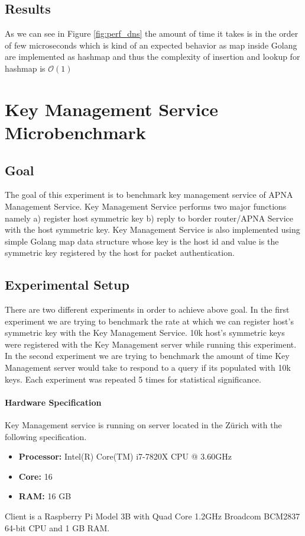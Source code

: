 \subsection{Results}
As we can see in Figure \ref{fig:perf_dns} the amount of time it takes is in the order of few microseconds which is kind of an expected behavior as map inside Golang are implemented as hashmap and thus the complexity of insertion and lookup for hashmap is $\mathcal{O}(1)$ 

\section{Key Management Service Microbenchmark}

\subsection{Goal}
The goal of this experiment is to benchmark key management service of APNA Management Service. Key Management Service performs two major functions namely a) register host symmetric key b) reply to border router/APNA Service with the host symmetric key. Key Management Service is also implemented using simple Golang map data structure whose key is the host id and value is the symmetric key registered by the host for packet authentication.

\subsection{Experimental Setup}
There are two different experiments in order to achieve above goal. In the first experiment we are trying to benchmark the rate at which we can register host's symmetric key with the Key Management Service. 10k host's symmetric keys were registered with the Key Management server while running this experiment. In the second experiment we are trying to benchmark the amount of time Key Management server would take to respond to a query if its populated with 10k keys. Each experiment was repeated 5 times for statistical significance.
\paragraph{Hardware Specification}
Key Management service is running on server located in the Z\"urich with the following specification.
\begin{itemize}
    \item \textbf{Processor:} Intel(R) Core(TM) i7-7820X CPU @ 3.60GHz
    \item \textbf{Core:} 16
    \item \textbf{RAM:} 16 GB
\end{itemize}
Client is a Raspberry Pi Model 3B with Quad Core 1.2GHz Broadcom BCM2837 64-bit CPU and 1 GB RAM.

